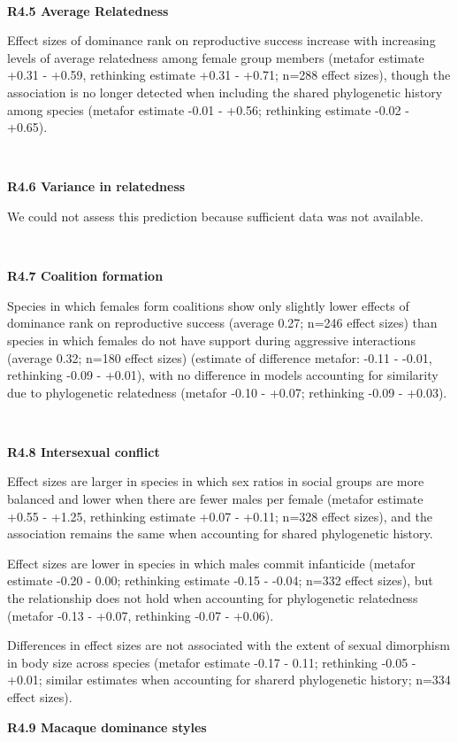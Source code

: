 \documentclass[
]{article}
\begin{document}
~

\textbf{R4.5 Average Relatedness}

Effect sizes of dominance rank on reproductive success increase with
increasing levels of average relatedness among female group members
(metafor estimate +0.31 - +0.59, rethinking estimate +0.31 - +0.71;
n=288 effect sizes), though the association is no longer detected when
including the shared phylogenetic history among species (metafor
estimate -0.01 - +0.56; rethinking estimate -0.02 - +0.65).

~

\textbf{R4.6 Variance in relatedness}

We could not assess this prediction because sufficient data was not
available.

~

\textbf{R4.7 Coalition formation}

Species in which females form coalitions show only slightly lower
effects of dominance rank on reproductive success (average 0.27; n=246
effect sizes) than species in which females do not have support during
aggressive interactions (average 0.32; n=180 effect sizes) (estimate of
difference metafor: -0.11 - -0.01, rethinking -0.09 - +0.01), with no
difference in models accounting for similarity due to phylogenetic
relatedness (metafor -0.10 - +0.07; rethinking -0.09 - +0.03).

~

\textbf{R4.8 Intersexual conflict}

Effect sizes are larger in species in which sex ratios in social groups
are more balanced and lower when there are fewer males per female
(metafor estimate +0.55 - +1.25, rethinking estimate +0.07 - +0.11;
n=328 effect sizes), and the association remains the same when
accounting for shared phylogenetic history.

Effect sizes are lower in species in which males commit infanticide
(metafor estimate -0.20 - 0.00; rethinking estimate -0.15 - -0.04; n=332
effect sizes), but the relationship does not hold when accounting for
phylogenetic relatedness (metafor -0.13 - +0.07, rethinking -0.07 -
+0.06).

Differences in effect sizes are not associated with the extent of sexual
dimorphism in body size across species (metafor estimate -0.17 - 0.11;
rethinking -0.05 - +0.01; similar estimates when accounting for sharerd
phylogenetic history; n=334 effect sizes).

\textbf{R4.9 Macaque dominance styles}
\end{document}
